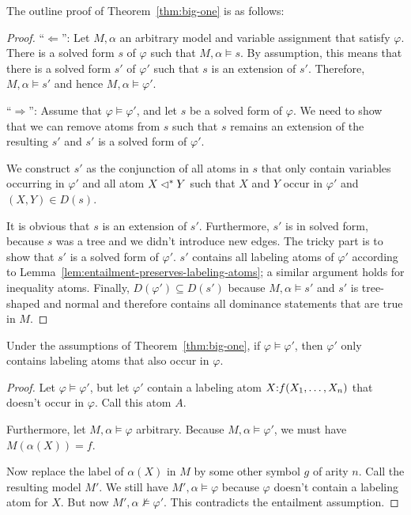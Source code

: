 The outline proof of Theorem~\ref{thm:big-one} is as follows:
\begin{proof}
  ``$\Leftarrow$'': Let $M,\alpha$ an arbitrary model and variable
  assignment that satisfy $\varphi$.  There is a solved form $s$ of
  $\varphi$ such that $M,\alpha \models s$.  By assumption, this means
  that there is a solved form $s'$ of $\varphi'$ such that $s$ is an
  extension of $s'$.  Therefore, $M,\alpha \models s'$ and hence
  $M,\alpha \models \varphi'$.

  ``$\Rightarrow$'': Assume that $\varphi \models \varphi'$, and let
  $s$ be a solved form of $\varphi$.  We need to show that
  we can remove atoms from $s$ such that $s$ remains an extension of
  the resulting $s'$ and $s'$ is a solved form of $\varphi'$.

  We construct $s'$ as the conjunction of all atoms in $s$ that only
  contain variables occurring in $\varphi'$ and all atom $X \lhd^* Y$
  such that $X$ and $Y$ occur in $\varphi'$ and $(X,Y) \in D(s)$.

  It is obvious that $s$ is an extension of $s'$.  Furthermore, $s'$
  is in solved form, because $s$ was a tree and we didn't
  introduce new edges.  The tricky part is to show that $s'$ is a
  solved form of $\varphi'$.  $s'$ contains all labeling atoms of
  $\varphi'$ according to
  Lemma~\ref{lem:entailment-preserves-labeling-atoms}; a similar
  argument holds for inequality atoms.  Finally, $D(\varphi')
  \subseteq D(s')$ because $M,\alpha \models s'$ and $s'$ is
  tree-shaped and normal and therefore contains all dominance statements
  that are true in $M$.
\end{proof}

\begin{lemma} \label{lem:entailment-preserves-labeling-atoms}
  Under the assumptions of
  Theorem~\ref{thm:big-one}, if $\varphi \models
  \varphi'$, then $\varphi'$ only contains labeling atoms that also
  occur in $\varphi$.  
\end{lemma}
\begin{proof}
  Let $\varphi \models \varphi'$, but let $\varphi'$ contain a
  labeling atom $X {:} f(X_1,\ldots,X_n)$ that doesn't occur in
  $\varphi$.  Call this atom $A$.

  Furthermore, let $M,\alpha \models \varphi$ arbitrary.  Because
  $M,\alpha \models \varphi'$, we must have $M(\alpha(X)) = f$.

  Now replace the label of $\alpha(X)$ in $M$ by some other symbol $g$
  of arity $n$.  Call the resulting model $M'$.  We still have
  $M',\alpha \models \varphi$ because $\varphi$ doesn't contain a
  labeling atom for $X$.  But now $M',\alpha \not\models \varphi'$.
  This contradicts the entailment assumption.
\end{proof}

